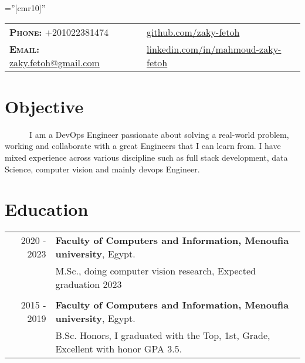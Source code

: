 \documentclass[a4paper,10pt]{article}
\begin{document}
\pagestyle{fancy}
\fancyhead{} 
\renewcommand{\headrulewidth}{0pt}

\font\fb=''[cmr10]'' 
\par{\bigskip\par} %


\begin{tabular}{lp{4cm}l}
\textbf{\textsc{Phone:}} +201022381474 && \href{https://github.com/zaky-fetoh}{github.com/zaky-fetoh} \\
\textbf{\textsc{Email:}}   \href{mailto:zaky.fetoh@gmail.com}{zaky.fetoh@gmail.com} &&\href{https://www.linkedin.com/in/mahmoud-zaky-fetoh/}{linkedin.com/in/mahmoud-zaky-fetoh}\\

\end{tabular}

\section{\textbf{Objective}}
~~~~~~I am a DevOps Engineer passionate about solving a real-world problem, working and collaborate with a great Engineers that I can learn from. I have mixed experience across various discipline such as full stack development, data Science, computer vision and mainly devops Engineer. 

\section{\textbf{Education}}
\begin{tabular}{r|l}
    2020 - 2023  & \textbf{Faculty of Computers and Information, Menoufia university}, Egypt.\\ & M.Sc., doing computer vision research, Expected graduation  2023 \\
    &\\
    2015 - 2019 & \textbf{Faculty of Computers and Information, Menoufia university}, Egypt. \\ & B.Sc. Honors, I graduated with the Top, 1st, Grade, Excellent with honor GPA 3.5. \\
    \end{tabular}
\end{document}

